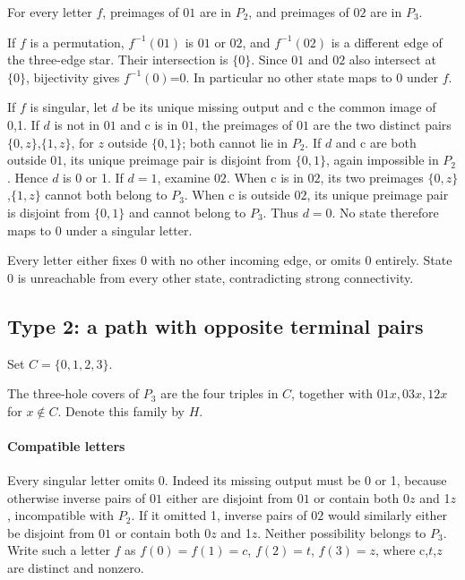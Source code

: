 \documentclass[11pt]{article}
\theoremstyle{definition}
\theoremstyle{plain}
\begin{document}
For every
letter \(f\), preimages of \(01\) are in \(P_2\), and preimages of \(02\) are in
\(P_3\).

If \(f\) is a permutation, \(f^{-1}(01)\) is \(01\) or \(02\), and
\(f^{-1}(02)\) is a different edge of the three-edge star.
Their intersection is \(\{0\}\). Since \(01\) and \(02\) also intersect at \(\{0\}\),
bijectivity gives \(f^{-1}(0)\)=0. In particular no other state
maps to 0 under \(f\).

If \(f\) is singular, let \(d\) be its unique missing output and c the
common image of 0,1. If \(d\) is not in \(01\) and c is in \(01\), the preimages
of \(01\) are the two distinct pairs \(\{0,z\}\),\(\{1,z\}\), for \(z\)
outside \(\{0,1\}\); both cannot lie in \(P_2\). If \(d\) and c are both
outside \(01\), its unique preimage pair is disjoint from \(\{0,1\}\), again
impossible in \(P_2\). Hence \(d\) is 0 or 1. If \(d=1\), examine \(02\).
When c is in \(02\), its two preimages \(\{0,z\}\),\(\{1,z\}\) cannot both
belong to \(P_3\). When c is outside \(02\), its unique preimage pair is
disjoint from \(\{0,1\}\) and cannot belong to \(P_3\). Thus \(d=0\). No state therefore maps to 0 under a singular letter.

Every letter either fixes 0 with no other incoming edge, or omits 0
entirely. State 0 is unreachable from every other state, contradicting
strong connectivity.
\subsection{Type 2: a path with opposite terminal pairs}\label{path-early-type-2-exclusion-at-codimension-three}

Set \(C=\{0,1,2,3\}\).

The three-hole covers of \(P_3\) are the four triples in \(C\), together with \(01x,03x,12x\) for \(x\notin C\). Denote this family by \(H\).

\paragraph{Compatible letters}\label{compatible-letters}

Every singular letter omits 0. Indeed its missing output must be 0 or 1,
because otherwise inverse pairs of \(01\) either are disjoint from \(01\) or
contain both 0\(z\) and 1\(z\), incompatible with \(P_{2}\). If it
omitted 1, inverse pairs of \(02\) would similarly either be disjoint from
\(01\) or contain both 0\(z\) and 1\(z\). Neither possibility belongs to
\(P_{3}\). Write such a letter \(f\) as \(f(0)=f(1)=c\), \(f(2)=t\),
\(f(3)=z\), where c,\(t\),\(z\) are distinct and nonzero.
\end{document}

